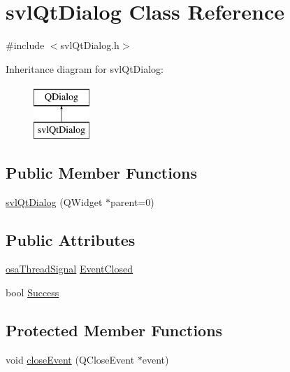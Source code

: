 \hypertarget{classsvl_qt_dialog}{}\section{svl\+Qt\+Dialog Class Reference}
\label{classsvl_qt_dialog}


{\ttfamily \#include $<$svl\+Qt\+Dialog.\+h$>$}

Inheritance diagram for svl\+Qt\+Dialog\+:\begin{figure}[H]
\begin{center}
\leavevmode
\includegraphics[height=2.000000cm]{d2/d95/classsvl_qt_dialog}
\end{center}
\end{figure}
\subsection*{Public Member Functions}
\begin{DoxyCompactItemize}
\item 
\hyperlink{classsvl_qt_dialog_a0e310dd8e0ae7ad927c2159e80ee79eb}{svl\+Qt\+Dialog} (Q\+Widget $\ast$parent=0)
\end{DoxyCompactItemize}
\subsection*{Public Attributes}
\begin{DoxyCompactItemize}
\item 
\hyperlink{classosa_thread_signal}{osa\+Thread\+Signal} \hyperlink{classsvl_qt_dialog_aeaa078633b0ba390bb5a4a9f7075d08d}{Event\+Closed}
\item 
bool \hyperlink{classsvl_qt_dialog_abb071021d600d1ddd5c4d331df8cb5b0}{Success}
\end{DoxyCompactItemize}
\subsection*{Protected Member Functions}
\begin{DoxyCompactItemize}
\item 
void \hyperlink{classsvl_qt_dialog_aca4668951e3c3237e2dc86ed4b22456f}{close\+Event} (Q\+Close\+Event $\ast$event)
\end{DoxyCompactItemize}


